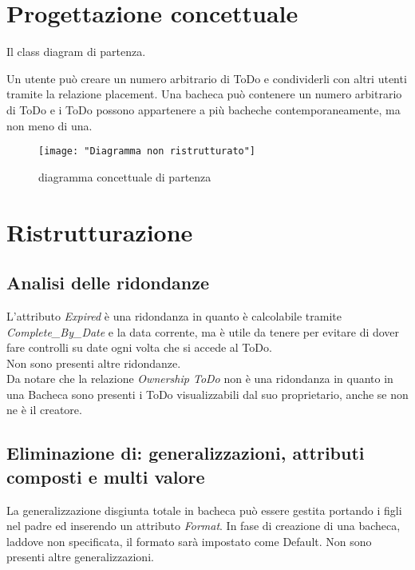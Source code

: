\documentclass{article}
\begin{document}
	\section{Progettazione concettuale}


	Il class diagram di partenza.
	
	Un utente può creare un numero arbitrario di ToDo e condividerli con altri utenti tramite la relazione placement.
	Una bacheca può contenere un numero arbitrario di ToDo e i ToDo possono appartenere a più bacheche contemporaneamente, ma non meno di una.

	\begin{figure}[h]
		\centering
		\texttt{[image: "Diagramma non ristrutturato"]}
		\caption[Diagramma concettuale]{diagramma concettuale di partenza}
		\label{fig:diagramma-non-ristrutturato}
	\end{figure}
	
	\pagebreak
	\section{Ristrutturazione}
		\subsection{Analisi delle ridondanze}
		
		L'attributo \textit{Expired} è una ridondanza in quanto è calcolabile tramite \textit{Complete{\_}By{\_}Date} e la data corrente, ma è utile da tenere per evitare di dover fare controlli su date ogni volta che si accede al ToDo. \\
		Non sono presenti altre ridondanze. \\
		
		Da notare che la relazione \textit{Ownership ToDo} non è una ridondanza in quanto in una Bacheca sono presenti i ToDo visualizzabili dal suo proprietario, anche se non ne è il creatore.
		
		\subsection{Eliminazione di: generalizzazioni, attributi composti e multi valore}
		
		La generalizzazione disgiunta totale in bacheca può essere gestita portando i figli nel padre ed inserendo un attributo \textit{Format}. In fase di creazione di una bacheca, laddove non specificata, il formato sarà impostato come Default.
		Non sono presenti altre generalizzazioni. \linebreak[2]
		
\end{document}
